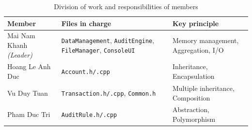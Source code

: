     \begin{table}[H]
        \centering
        \caption{Division of work and responsibilities of members}
        \label{tab:phancong}
        \begin{tabular}{|l|p{4cm}|p{3.8cm}|}
            \hline
            \textbf{Member} & \textbf{Files in charge} & \textbf{Key principle} \\ \hline
            Mai Nam Khanh \textit{(Leader)} & \texttt{DataManagement}, \texttt{AuditEngine}, \texttt{FileManager}, \texttt{ConsoleUI} & Memory management, Aggregation, I/O \\ \hline
            Hoang Le Anh Duc & \texttt{Account.h/.cpp} & Inheritance, Encapsulation \\ \hline
            Vu Duy Tuan & \texttt{Transaction.h/.cpp}, \texttt{Common.h} & Multiple inheritance, Composition \\ \hline
            Pham Duc Tri & \texttt{AuditRule.h/.cpp} & Abstraction, Polymorphism \\ \hline
        \end{tabular}
    \end{table}
